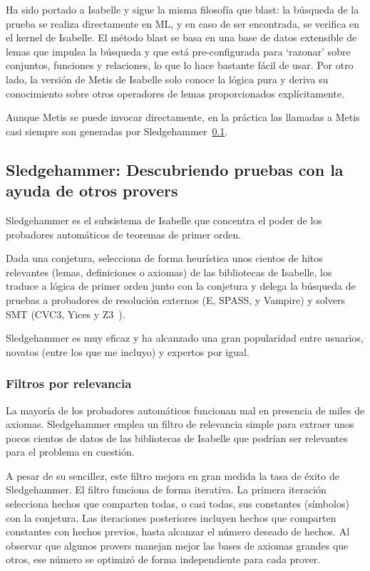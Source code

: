 \documentclass[12pt]{book}
\begin{document}
Ha sido portado a Isabelle y sigue la misma filosofía que blast: la búsqueda de la prueba se realiza directamente en ML, y en caso de ser encontrada, se verifica en el kernel de Isabelle.
El método blast se basa en una base de datos extensible de lemas que impulsa la búsqueda y que está pre-configurada para `razonar' sobre conjuntos, funciones y relaciones, lo que lo hace bastante fácil de usar. Por otro lado, la versión de Metis de Isabelle solo conoce la lógica pura y deriva su conocimiento sobre otros operadores de lemas proporcionados explícitamente.

Aunque Metis se puede invocar directamente, en la práctica las llamadas a Metis casi siempre son generadas por Sledgehammer~\ref{sec:Sledgehammer}.


\subsection{Sledgehammer: Descubriendo pruebas con la ayuda de otros provers}\label{sec:Sledgehammer}

Sledgehammer es el subsistema de Isabelle que concentra el poder de los probadores automáticos de teoremas de primer orden.

Dada una conjetura, selecciona de forma heurística unos cientos de hitos relevantes (lemas, definiciones o axiomas) de las bibliotecas de Isabelle, los traduce a lógica de primer orden junto con la conjetura y delega la búsqueda de pruebas a probadores de resolución externos (E, SPASS, y Vampire) y solvers SMT (CVC3, Yices y Z3~\cite{Z3}).

Sledgehammer es muy eficaz y ha alcanzado una gran popularidad entre usuarios, novatos (entre los que me incluyo) y expertos por igual.

\subsubsection{Filtros por relevancia}

La mayoría de los probadores automáticos funcionan mal en presencia de miles de axiomas. Sledgehammer emplea un filtro de relevancia simple para extraer unos pocos cientos de datos de las bibliotecas de Isabelle que podrían ser relevantes para el problema en cuestión.

A pesar de su sencillez, este filtro mejora en gran medida la tasa de éxito de Sledgehammer. El filtro funciona de forma iterativa. La primera iteración selecciona hechos que comparten todas, o casi todas, sus constantes (símbolos) con la conjetura. Las iteraciones posteriores incluyen hechos que comparten constantes con hechos previos, hasta alcanzar el número deseado de hechos. Al observar que algunos provers manejan mejor las bases de axiomas grandes que otros, ese número se optimizó de forma independiente para cada prover.
\end{document}
